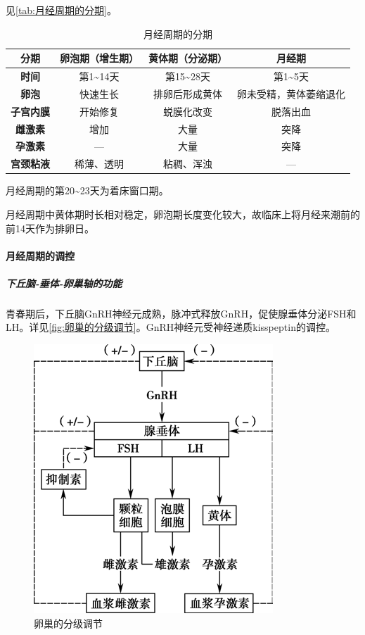 见\autoref{tab:月经周期的分期}。

\begin{table}[htbp]
	\centering
	\begin{tabularx}{\textwidth}{|c|c|c|C|}
		\hline
		\textbf{分期} & 卵泡期（增生期） & 黄体期（分泌期） & 月经期 \\ \hline
		\textbf{时间} & 第1\textasciitilde14天 & 第15\textasciitilde28天 & 第1\textasciitilde5天 \\ \hline
		\textbf{卵泡} & 快速生长 & 排卵后形成黄体 & 卵未受精，黄体萎缩退化 \\ \hline
		\textbf{子宫内膜} & 开始修复 & 蜕膜化改变 & 脱落出血 \\ \hline
		\textbf{雌激素} & 增加 & 大量 & 突降 \\ \hline
		\textbf{孕激素} & --- & 大量 & 突降 \\ \hline
		\textbf{宫颈粘液} & 稀薄、透明 & 粘稠、浑浊 & --- \\ \hline
	\end{tabularx}
	\caption{月经周期的分期}
	\label{tab:月经周期的分期}
\end{table}

月经周期的第20\textasciitilde23天为着床窗口期。

月经周期中黄体期时长相对稳定，卵泡期长度变化较大，故临床上将月经来潮前的前14天作为排卵日。

\paragraph{月经周期的调控}

\subparagraph{下丘脑-垂体-卵巢轴的功能}

青春期后，下丘脑GnRH神经元成熟，脉冲式释放GnRH，促使腺垂体分泌FSH和LH。详见\autoref{fig:卵巢的分级调节}。GnRH神经元受神经递质kisspeptin的调控。

\begin{figure}[htbp]
	\centering
	\includegraphics[width=0.3\linewidth]{Pics/卵巢的分级调节}
	\caption{卵巢的分级调节}
	\label{fig:卵巢的分级调节}
\end{figure}

